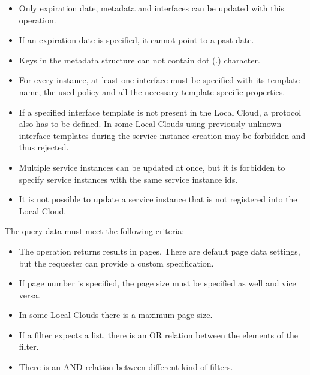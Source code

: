 \documentclass[a4paper]{arrowhead}
\begin{document}
\begin{itemize}
    \item Only expiration date, metadata and interfaces can be updated with this operation.
    \item If an expiration date is specified, it cannot point to a past date.
    \item Keys in the metadata structure can not contain dot (.) character.
    \item For every instance, at least one interface must be specified with its template name, the used policy and all the necessary template-specific properties.
    \item If a specified interface template is not present in the Local Cloud, a protocol also has to be defined. In some Local Clouds using previously unknown interface templates during the service instance creation may be forbidden and thus rejected.
    \item Multiple service instances can be updated at once, but it is forbidden to specify service instances with the same service instance ids.
    \item It is not possible to update a service instance that is not registered into the Local Cloud.
\end{itemize}



The query data must meet the following criteria:

\begin{itemize}
    \item The operation returns results in pages. There are default page data settings, but the requester can provide a custom specification.
    \item If page number is specified, the page size must be specified as well and vice versa.
    \item In some Local Clouds there is a maximum page size.
    \item If a filter expects a list, there is an OR relation between the elements of the filter.
    \item There is an AND relation between different kind of filters.
\end{itemize} 

\end{document}
